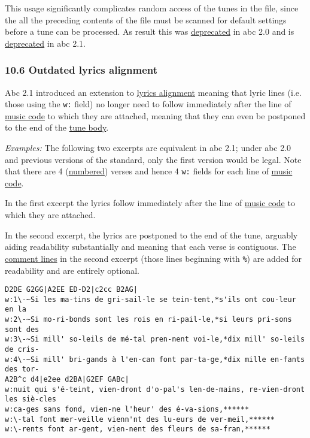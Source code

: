This usage significantly complicates random access of the tunes in the
file, since the all the preceding contents of the file must be scanned
for default settings before a tune can be processed. As result this was
\protect\hyperlink{outdated_syntax}{deprecated} in abc 2.0 and is
\protect\hyperlink{outdated_syntax}{deprecated} in abc 2.1.

\hypertarget{outdated_lyrics_alignment}{\subsubsection{10.6 Outdated
lyrics alignment}\label{outdated_lyrics_alignment}}

Abc 2.1 introduced an extension to \protect\hyperlink{alignment}{lyrics
alignment} meaning that lyric lines (i.e. those using the \texttt{w:}
field) no longer need to follow immediately after the line of
\protect\hyperlink{music_code_definition}{music code} to which they are
attached, meaning that they can even be postponed to the end of the
\protect\hyperlink{tune_body_definition}{tune body}.

\emph{Examples:} The following two excerpts are equivalent in abc 2.1;
under abc 2.0 and previous versions of the standard, only the first
version would be legal. Note that there are 4
(\protect\hyperlink{numbering}{numbered}) verses and hence 4 \texttt{w:}
fields for each line of \protect\hyperlink{music_code_definition}{music
code}.

In the first excerpt the lyrics follow immediately after the line of
\protect\hyperlink{music_code_definition}{music code} to which they are
attached.

In the second excerpt, the lyrics are postponed to the end of the tune,
arguably aiding readability substantially and meaning that each verse is
contiguous. The \protect\hyperlink{comment_definition}{comment lines} in
the second excerpt (those lines beginning with \texttt{\%}) are added
for readability and are entirely optional.

\begin{verbatim}
D2DE G2GG|A2EE ED-D2|c2cc B2AG|
w:1\-~Si les ma-tins de gri-sail-le se tein-tent,*s'ils ont cou-leur en la
w:2\-~Si mo-ri-bonds sont les rois en ri-pail-le,*si leurs pri-sons sont des
w:3\-~Si mill' so-leils de mé-tal pren-nent voi-le,*dix mill' so-leils de cris-
w:4\-~Si mill' bri-gands à l'en-can font par-ta-ge,*dix mille en-fants des tor-
A2B^c d4|e2ee d2BA|G2EF GABc|
w:nuit qui s'é-teint, vien-dront d'o-pal's len-de-mains, re-vien-dront les siè-cles
w:ca-ges sans fond, vien-ne l'heur' des é-va-sions,******
w:\-tal font mer-veille vienn'nt des lu-eurs de ver-meil,******
w:\-rents font ar-gent, vien-nent des fleurs de sa-fran,******
\end{verbatim}

